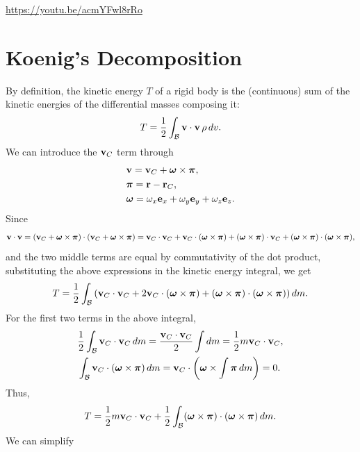 \documentclass[
  letterpaper,
  DIV=11,
  numbers=noendperiod]{scrreprt}
\newcommand{\lp}{\left(}
\newcommand{\rp}{\right)}
\newcommand{\bomega}{\boldsymbol{\omega}}
\newcommand{\bpi}{\boldsymbol{\pi}}
\begin{document}
\url{https://youtu.be/acmYFwl8rRo}

\section{Koenig's Decomposition}\label{koenigs-decomposition}

By definition, the kinetic energy \(T\) of a rigid body is the
(continuous) sum of the kinetic energies of the differential masses
composing it: \begin{align}
    T = \frac{1}{2}\int_{\mathcal{B}}{\bf v}\cdot{\bf v}\,\rho\,dv.
\end{align} We can introduce the \({\bf v}_C\) term through
\begin{align}
    \begin{split}
        & {\bf v} = {\bf v}_C+\bomega\times\bpi,\\
        & \bpi = {\bf r}-{\bf r}_C,\\
        & \bomega = \omega_x{\bf e}_x+\omega_y{\bf e}_y+\omega_z{\bf e}_z.
    \end{split}
\end{align} Since \begin{align}
    {\bf v}\cdot{\bf v} = ({\bf v}_C+\bomega\times\bpi)\cdot({\bf v}_C+\bomega\times\bpi) = {\bf v}_C\cdot{\bf v}_C+{\bf v}_C\cdot(\bomega\times\bpi)+(\bomega\times\bpi)\cdot{\bf v}_C+(\bomega\times\bpi)\cdot(\bomega\times\bpi),
\end{align} and the two middle terms are equal by commutativity of the
dot product, substituting the above expressions in the kinetic energy
integral, we get \begin{align}
    T = \frac{1}{2}\int_{\mathcal{B}}\lp{\bf v}_C\cdot{\bf v}_C+2{\bf v}_C\cdot(\bomega\times\bpi)+(\bomega\times\bpi)\cdot(\bomega\times\bpi)\rp dm.
\end{align} For the first two terms in the above integral, \begin{align}
    \begin{split}
        & \frac{1}{2}\int_{\mathcal{B}}{\bf v}_C\cdot{\bf v}_C\,dm = \frac{{\bf v}_C\cdot{\bf v}_C}{2}\int dm = \frac{1}{2}m{\bf v}_C\cdot{\bf v}_C,\\
        & \int_{\mathcal{B}}{\bf v}_C\cdot(\bomega\times\bpi)\,dm = {\bf v}_C\cdot\lp\bomega\times\int\bpi\,dm\rp = 0.
    \end{split}
\end{align} Thus, \begin{align}
    T = \frac{1}{2}m{\bf v}_C\cdot{\bf v}_C+\frac{1}{2}\int_{\mathcal{B}}(\bomega\times\bpi)\cdot(\bomega\times\bpi)\,dm.
\end{align} We can simplify
\end{document}
